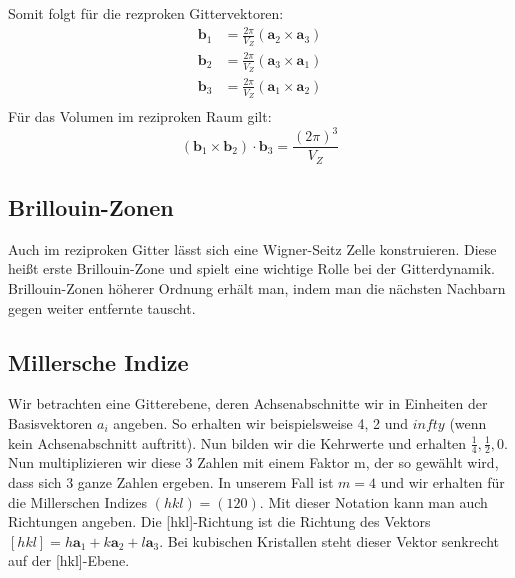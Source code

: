 \documentclass[11pt]{article}
\begin{document}
Somit folgt für die rezproken Gittervektoren:
\begin{equation}
  \begin{align}
    \bm{b}_1&=\frac{2\pi}{V_Z}(\bm{a}_2\times\bm{a}_3) \\
    \bm{b}_2&=\frac{2\pi}{V_Z}(\bm{a}_3\times\bm{a}_1) \\
    \bm{b}_3&=\frac{2\pi}{V_Z}(\bm{a}_1\times\bm{a}_2) \\
  \end{align}
\end{equation}
Für das Volumen im reziproken Raum gilt:
\begin{equation}
  (\bm{b}_1\times\bm{b}_2)\cdot\bm{b}_3=\frac{(2\pi)^3}{V_Z}
\end{equation}
\subsection{Brillouin-Zonen}
Auch im reziproken Gitter lässt sich eine Wigner-Seitz Zelle konstruieren.
Diese heißt erste Brillouin-Zone und spielt eine wichtige Rolle bei der
Gitterdynamik. Brillouin-Zonen höherer Ordnung erhält man, indem man die
nächsten Nachbarn gegen weiter entfernte tauscht.
\subsection{Millersche Indize}
Wir betrachten eine Gitterebene, deren Achsenabschnitte wir in Einheiten
der Basisvektoren $a_i$ angeben. So erhalten wir beispielsweise 4, 2 und $infty$
(wenn kein Achsenabschnitt auftritt). Nun bilden wir die Kehrwerte und erhalten
$\frac{1}{4}, \frac{1}{2}, 0$. Nun multiplizieren wir diese 3 Zahlen mit einem
Faktor m, der so gewählt wird, dass sich 3 ganze Zahlen ergeben. In unserem
Fall ist $m=4$ und wir erhalten für die Millerschen Indizes $(hkl)= (120)$. Mit
dieser Notation kann man auch Richtungen angeben. Die [hkl]-Richtung ist die
Richtung des Vektors $[hkl]=h\bm{a}_1+k\bm{a}_2+l\bm{a}_3$. Bei kubischen
Kristallen steht dieser Vektor senkrecht auf der [hkl]-Ebene.
\end{document}
